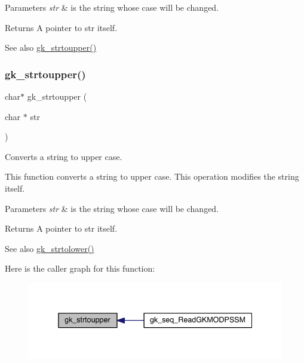 \begin{DoxyParams}{Parameters}
{\em str} & is the string whose case will be changed. \\
\hline
\end{DoxyParams}
\begin{DoxyReturn}{Returns}
A pointer to {\ttfamily str} itself. 
\end{DoxyReturn}
\begin{DoxySeeAlso}{See also}
\hyperlink{a00143_ae2e962be7af156e5200766fa8543cff1}{gk\+\_\+strtoupper()} 
\end{DoxySeeAlso}
\mbox{\label{a00077_adc708027212f8668786472b408628f64}} 
\subsubsection{\texorpdfstring{gk\+\_\+strtoupper()}{gk\_strtoupper()}}
{\footnotesize\ttfamily char$\ast$ gk\+\_\+strtoupper (\begin{DoxyParamCaption}\item[{char $\ast$}]{str }\end{DoxyParamCaption})}



Converts a string to upper case. 

This function converts a string to upper case. This operation modifies the string itself.


\begin{DoxyParams}{Parameters}
{\em str} & is the string whose case will be changed. \\
\hline
\end{DoxyParams}
\begin{DoxyReturn}{Returns}
A pointer to {\ttfamily str} itself. 
\end{DoxyReturn}
\begin{DoxySeeAlso}{See also}
\hyperlink{a00143_aa2d603de6c132e340d85e8e125d847a0}{gk\+\_\+strtolower()} 
\end{DoxySeeAlso}
Here is the caller graph for this function\+:\nopagebreak
\begin{figure}[H]
\begin{center}
\leavevmode
\includegraphics[width=338pt]{a00077_adc708027212f8668786472b408628f64_icgraph}
\end{center}
\end{figure}
\mbox{\label{a00077_a3090611e4e08f52edd87b455dcb420c8}} 

